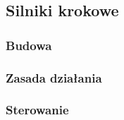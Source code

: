 \subsection{Silniki krokowe}

\subsubsection{Budowa}

\subsubsection{Zasada działania}

\subsubsection{Sterowanie}

\clearpage

